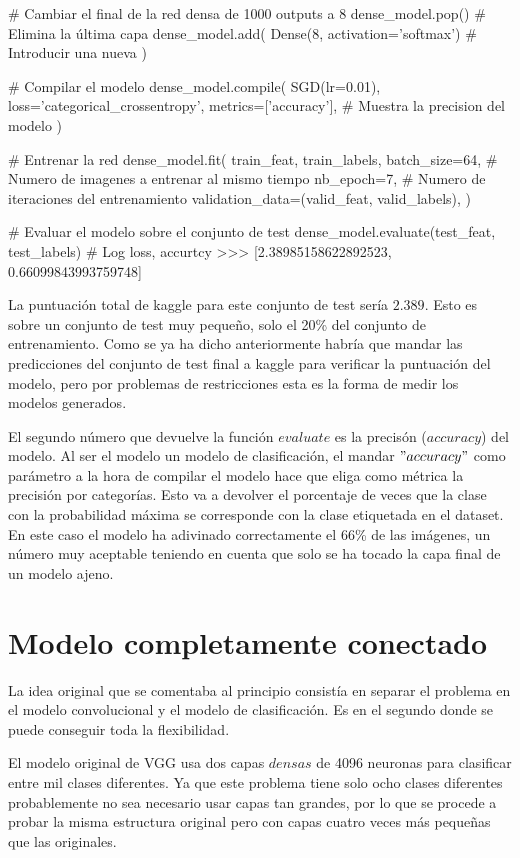 \begin{python}

# Cambiar el final de la red densa de 1000 outputs a 8
dense_model.pop()  # Elimina la última capa
dense_model.add(
    Dense(8, activation='softmax')  # Introducir una nueva
)

# Compilar el modelo
dense_model.compile(
    SGD(lr=0.01),
    loss='categorical_crossentropy',
    metrics=['accuracy'],  # Muestra la precision del modelo
)

# Entrenar la red
dense_model.fit(
    train_feat,
    train_labels,
    batch_size=64,  # Numero de imagenes a entrenar al mismo tiempo
    nb_epoch=7,     # Numero de iteraciones del entrenamiento
    validation_data=(valid_feat, valid_labels),
)

# Evaluar el modelo sobre el conjunto de test
dense_model.evaluate(test_feat, test_labels)
# Log loss, accurtcy
>>> [2.38985158622892523, 0.66099843993759748]
\end{python}

La puntuación total de kaggle para este conjunto de test sería $2.389$. Esto es sobre un conjunto de test muy pequeño, solo el 20\% del conjunto de entrenamiento. Como se ya ha dicho anteriormente habría que mandar las predicciones del conjunto de test final a kaggle para verificar la puntuación del modelo, pero por problemas de restricciones esta es la forma de medir los modelos generados.

El segundo número que devuelve la función $evaluate$ es la precisón ($accuracy$) del modelo. Al ser el modelo un modelo de clasificación, el mandar $"accuracy"$ como parámetro a la hora de compilar el modelo hace que eliga como métrica la precisión por categorías. Esto va a devolver el porcentaje de veces que la clase con la probabilidad máxima se corresponde con la clase etiquetada en el dataset. En este caso el modelo ha adivinado correctamente el 66\% de las imágenes, un número muy aceptable teniendo en cuenta que solo se ha tocado la capa final de un modelo ajeno.

\section{Modelo completamente conectado}

La idea original que se comentaba al principio consistía en separar el problema en el modelo convolucional y el modelo de clasificación. Es en el segundo donde se puede conseguir toda la flexibilidad. 

El modelo original de VGG usa dos capas $densas$ de 4096 neuronas para clasificar entre mil clases diferentes. Ya que este problema tiene solo ocho clases diferentes probablemente no sea necesario usar capas tan grandes, por lo que se procede a probar la misma estructura original pero con capas cuatro veces más pequeñas que las originales.

